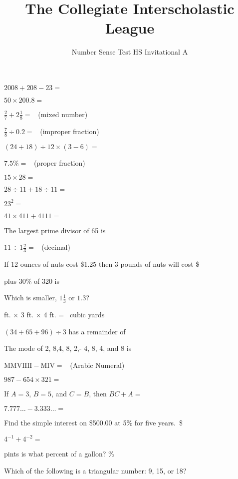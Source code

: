 \documentclass{numbersense}
\title{The Collegiate Interscholastic League}
\subtitle{Number Sense Test \bigdot HS Invitational A \bigdot 2008}
\begin{document}
\begin{questions}

    \q[2265] $2008 + 208 - 23 = $ \ans

    \q[10040] $50 \times 200.8 = $ \ans

    \q[$2\frac{23}{56}$] $\frac{2}{7} + 2 \frac{1}{8} = $ \ans~(mixed number)

    \q[$\frac{35}{8}$] $\frac{7}{8} \div 0.2 = $ \ans~(improper fraction)

      $(24 + 18) \div 12 \times (3-6) =$ \ans

    \q[$\frac{3}{40}$] $7.5\% = $ \ans~(proper fraction)

    \q[420] $15 \times 28 = $ \ans

    \q $28 \div 11 + 18 \div 11 = $ \ans

    \q $23^2 =$ \ans

    \aq[testing] $41 \times 411 + 4111=$ \ans

    \q The largest prime divisor of 65 is \ans

    \q $11 \div 1\frac{2}{3}=$ \ans~(decimal)

    \q If 12 ounces of nuts cost \$1.25 then 3 pounds of nuts will cost \$\ans

     plus 30\% of 320 is \ans

    \q Which is smaller, $1\frac{1}{3}$ or $1.3$? \ans

     ft. $ \times $ 3 ft. $\times$ 4 ft. = \ans~cubic yards

    \q $(34 + 65 + 96) \div 3$ has a remainder of \ans

    \columnbreak

    \q The mode of 2, 8,4, 8, 2,- 4, 8, 4, and 8 is \ans


    \q $\textrm{MMVIIII} - \textrm{MIV} =$ \ans~(Arabic Numeral)

    \aq $987 - 654 \times 321 = $ \ans

    \q If $A = 3$, $B=5$, and $C = B$, then $BC + A = $ \ans

    \q $7.777\ldots - 3.333\ldots = $ \ans

    \q Find the simple interest on \$500.00 at 5\% for five years.~\$\ans

    \q $4^{-1} + 4^{-2} = $ \ans

     pints is what percent of a gallon? \ans\%

    \q Which of the following is a triangular number: 9, 15, or 18? \ans


\end{questions}
\end{document}
